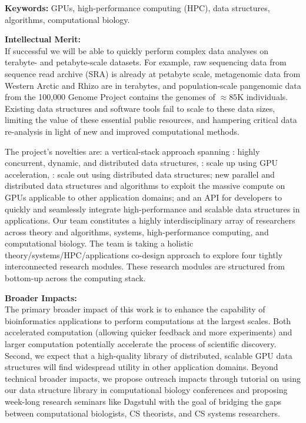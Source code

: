 \noindent \textbf{\large Keywords:} GPUs, high-performance computing (HPC), data structures, algorithms,   computational biology.

\noindent \textbf{\large Intellectual Merit:}\\
If successful we will be able to quickly perform complex data analyses on terabyte- and petabyte-scale datasets. For example, raw sequencing data from sequence read archive (SRA) is already at petabyte scale, metagenomic data from Western Arctic and Rhizo are in terabytes, and population-scale pangenomic data from the 100,000 Genome Project contains the genomes of $\approx85$K individuals. Existing data structures and software tools fail to scale to these data sizes, limiting the value of these essential public resources, and hampering critical data re-analysis in light of new and improved computational methods.

The project’s novelties are: a vertical-stack approach spanning : highly concurrent, dynamic, and distributed data structures,
: scale up using GPU acceleration, : scale out using distributed data structures; new parallel and
distributed data structures and algorithms to exploit the massive compute on
GPUs applicable to other application domains; and an API for developers to
quickly and seamlessly integrate high-performance and scalable data structures
in applications.
%
Our team constitutes a highly interdisciplinary array of researchers across theory and algorithms, systems, high-performance computing, and computational biology. The team is taking a holistic theory/systems/HPC/applications co-design approach to explore four tightly interconnected research modules. These research modules are structured from bottom-up across the computing stack.


\noindent \textbf{\large Broader Impacts: }\\
The primary broader impact of this work is to enhance the capability of
bioinformatics applications to perform computations at the largest scales. Both
accelerated computation (allowing quicker feedback and more experiments) and
larger computation potentially accelerate the process of scientific discovery.
Second, we expect that a high-quality library of distributed, scalable GPU data
structures will find widespread utility in other application domains.
%
Beyond technical broader impacts, we propose outreach impacts through tutorial
on using our data structure library in computational biology conferences and
proposing week-long research seminars like Dagstuhl with the goal of bridging
the gaps between computational biologists, CS theorists, and CS systems
researchers. 
